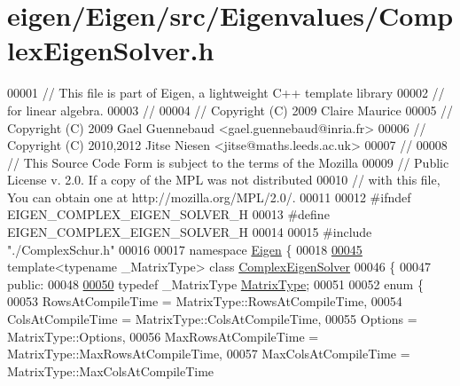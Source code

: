 \hypertarget{eigen_2_eigen_2src_2_eigenvalues_2_complex_eigen_solver_8h_source}{}\section{eigen/\+Eigen/src/\+Eigenvalues/\+Complex\+Eigen\+Solver.h}
\label{eigen_2_eigen_2src_2_eigenvalues_2_complex_eigen_solver_8h_source}

\begin{DoxyCode}
00001 \textcolor{comment}{// This file is part of Eigen, a lightweight C++ template library}
00002 \textcolor{comment}{// for linear algebra.}
00003 \textcolor{comment}{//}
00004 \textcolor{comment}{// Copyright (C) 2009 Claire Maurice}
00005 \textcolor{comment}{// Copyright (C) 2009 Gael Guennebaud <gael.guennebaud@inria.fr>}
00006 \textcolor{comment}{// Copyright (C) 2010,2012 Jitse Niesen <jitse@maths.leeds.ac.uk>}
00007 \textcolor{comment}{//}
00008 \textcolor{comment}{// This Source Code Form is subject to the terms of the Mozilla}
00009 \textcolor{comment}{// Public License v. 2.0. If a copy of the MPL was not distributed}
00010 \textcolor{comment}{// with this file, You can obtain one at http://mozilla.org/MPL/2.0/.}
00011 
00012 \textcolor{preprocessor}{#ifndef EIGEN\_COMPLEX\_EIGEN\_SOLVER\_H}
00013 \textcolor{preprocessor}{#define EIGEN\_COMPLEX\_EIGEN\_SOLVER\_H}
00014 
00015 \textcolor{preprocessor}{#include "./ComplexSchur.h"}
00016 
00017 \textcolor{keyword}{namespace }\hyperlink{namespace_eigen}{Eigen} \{ 
00018 
\hyperlink{group___eigenvalues___module}{00045} \textcolor{keyword}{template}<\textcolor{keyword}{typename} \_MatrixType> \textcolor{keyword}{class }\hyperlink{group___eigenvalues___module_class_eigen_1_1_complex_eigen_solver}{ComplexEigenSolver}
00046 \{
00047   \textcolor{keyword}{public}:
00048 
\hyperlink{group___eigenvalues___module_ad61f6278843a601096276c9a72c0252f}{00050}     \textcolor{keyword}{typedef} \_MatrixType \hyperlink{group___eigenvalues___module_ad61f6278843a601096276c9a72c0252f}{MatrixType};
00051 
00052     \textcolor{keyword}{enum} \{
00053       RowsAtCompileTime = MatrixType::RowsAtCompileTime,
00054       ColsAtCompileTime = MatrixType::ColsAtCompileTime,
00055       Options = MatrixType::Options,
00056       MaxRowsAtCompileTime = MatrixType::MaxRowsAtCompileTime,
00057       MaxColsAtCompileTime = MatrixType::MaxColsAtCompileTime

\end{DoxyCode}
